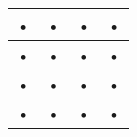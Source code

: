 \documentclass[10pt,a4paper]{article}
\begin{document}
\begin{tabular}{|c|c|c|c|}
\hline 
• & • & • & • \\ 
\hline 
• & • & • & • \\ 
\hline 
• & • & • & • \\ 
\hline 
• & • & • & • \\ 
\hline 
\end{tabular} 
\end{document}
